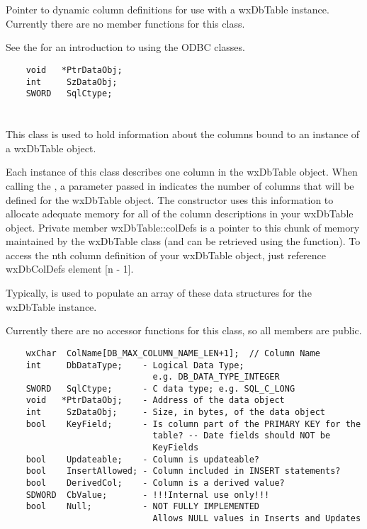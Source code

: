 

\section{}\label{wxdbcoldataptr}

Pointer to dynamic column definitions for use with a wxDbTable instance.
Currently there are no member functions for this class.

See the  for
an introduction to using the ODBC classes.

\begin{verbatim}
    void   *PtrDataObj;
    int     SzDataObj;
    SWORD   SqlCtype;
\end{verbatim}

\section{}\label{wxdbcoldef}

This class is used to hold information about the columns bound to an
instance of a wxDbTable object.

Each instance of this class describes one column in the wxDbTable
object.  When calling the , a
parameter passed in indicates the number of columns that will be defined for
the wxDbTable object.  The constructor uses this information to allocate
adequate memory for all of the column descriptions in your wxDbTable object.
Private member wxDbTable::colDefs is a pointer to this chunk of memory
maintained by the wxDbTable class (and can be retrieved using the
 function).
To access the nth column definition of your wxDbTable object, just reference
wxDbColDefs element [n - 1].

Typically,  is used to
populate an array of these data structures for the wxDbTable instance.

Currently there are no accessor functions for this class, so all members are
public.

\begin{verbatim}
    wxChar  ColName[DB_MAX_COLUMN_NAME_LEN+1];  // Column Name
    int     DbDataType;    - Logical Data Type;
                             e.g. DB_DATA_TYPE_INTEGER
    SWORD   SqlCtype;      - C data type; e.g. SQL_C_LONG
    void   *PtrDataObj;    - Address of the data object
    int     SzDataObj;     - Size, in bytes, of the data object
    bool    KeyField;      - Is column part of the PRIMARY KEY for the
                             table? -- Date fields should NOT be
                             KeyFields
    bool    Updateable;    - Column is updateable?
    bool    InsertAllowed; - Column included in INSERT statements?
    bool    DerivedCol;    - Column is a derived value?
    SDWORD  CbValue;       - !!!Internal use only!!!
    bool    Null;          - NOT FULLY IMPLEMENTED
                             Allows NULL values in Inserts and Updates
\end{verbatim}

